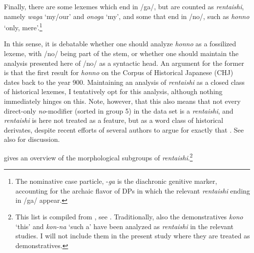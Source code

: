 Finally, there are some lexemes which end in /ga/, but are counted as \textit{rentaishi}, namely \textit{waga} `my/our' and \textit{onoga} `my’, and some that end in /no/, such as \textit{honno} `only, mere’.\footnote{The nominative case particle, -\textit{ga} is the diachronic genitive marker, accounting for the archaic flavor of DPs in which the relevant \textit{rentaishi} ending in /ga/ appear.}

In this sense, it is debatable whether one should analyze \textit{honno} as a fossilized lexeme, with /no/ being part of the stem, or whether one should maintain the analysis presented here of /no/ as a syntactic head. An argument for the former is that the first result for \textit{honno} on the  Corpus of Historical Japanese (CHJ) dates back to the year 900. Maintaining an analysis of \textit{rentaishi} as a closed class of historical lexemes, I tentatively opt for this analysis, although nothing immediately hinges on this. Note, however, that this also means that not every direct-only \textit{no}-modifier (sorted in group 5) in the data set is a \textit{rentaishi}, and \textit{rentaishi} is here not treated as a feature, but as a word class of historical derivates, despite recent efforts of several authors to argue for exactly that \citep{muraki:1996:imi, muraki:2009:nihongo, muraki:2012:nihongo, muraki:2015:hinshi, oshima:2021:nihongo, oshima:2021:redefining, abe:2022:no}. See also \citet{kohlich:2023:uninflecting} for discussion.

 gives an overview of the morphological subgroups of \textit{rentaishi}.\footnote{This
    list is compiled from \citet{mitsuya:1932:bunpo, kieda:1938:koto, suzuki:1972:nihon, komatsu:1973:rentaishi, tokieda:1941:kokugogaku, mio:1958:hanashi, kai:1980:rentaishi, kim:2006:kindai, matsubara:2009:nihongo}, see \citet[181–182]{kohlich:2020:rentaishi}. Traditionally, also the demonstratives \textit{kono} `this' and \textit{kon-na} `such a’ have been analyzed as \textit{rentaishi} in the relevant studies. I will not include them in the present study where they are treated as demonstratives.}

